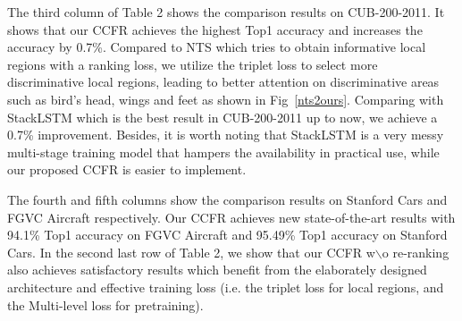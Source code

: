 \documentclass[10pt,twocolumn,letterpaper]{article}
\begin{document}
The third column of Table 2 shows the comparison results on CUB-200-2011. It shows that our CCFR achieves the highest Top1 accuracy and increases the accuracy by 0.7\%. Compared to NTS\cite{YangLWHGW18} which tries to obtain informative local regions with a ranking loss, we utilize the triplet loss to select more discriminative local regions, leading to better attention on discriminative areas such as bird’s head, wings and feet as shown in Fig~\ref{nts2ours}. Comparing with StackLSTM\cite{GeLY19} which is the best result in CUB-200-2011 up to now, we achieve a 0.7\% improvement. Besides, it is worth noting that StackLSTM is a very messy multi-stage training model that hampers the availability in practical use, while our proposed CCFR is easier to implement.

The fourth and fifth columns show the comparison results on Stanford Cars and FGVC Aircraft respectively. Our CCFR achieves new state-of-the-art results with 94.1\% Top1 accuracy on FGVC Aircraft and 95.49\% Top1 accuracy on Stanford Cars. In the second last row of Table 2, we show that our CCFR w$\backslash$o re-ranking also achieves satisfactory results which benefit from the elaborately designed architecture and effective training loss (i.e. the triplet loss for local regions, and the Multi-level loss for pretraining). 
\end{document}
